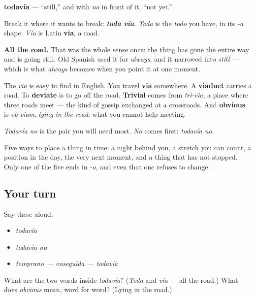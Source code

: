 \begin{cousinweb}
\textbf{todavía} — \textquotedblleft{}still,\textquotedblright{} and with \emph{no} in front of it, \textquotedblleft{}not yet.\textquotedblright{}

Break it where it wants to break: \emph{\textbf{toda vía}}. \emph{Toda} is the \emph{todo} you have, in its \emph{-a} shape. \emph{Vía} is Latin \textbf{via}, a road.

\textbf{All the road.} That was the whole sense once: the thing has gone the entire way and is going still. Old Spanish used it for \emph{always}, and it narrowed into \emph{still} — which is what \emph{always} becomes when you point it at one moment.

The \emph{via} is easy to find in English. You travel \textbf{via} somewhere. A \textbf{viaduct} carries a road. To \textbf{deviate} is to go off the road. \textbf{Trivial} comes from \emph{tri-via}, a place where three roads meet — the kind of gossip exchanged at a crossroads. And \textbf{obvious} is \emph{ob viam}, \emph{lying in the road}: what you cannot help meeting.

\emph{Todavía no} is the pair you will need most. \emph{No} comes first: \emph{todavía no}.
\end{cousinweb}

\begin{grammarlens}[title={What you've built}]
Five ways to place a thing in time: a night behind you, a stretch you can count, a position in the day, the very next moment, and a thing that has not stopped. Only one of the five ends in \emph{-o}, and even that one refuses to change.
\end{grammarlens}

\subsection*{Your turn}
Say these aloud:

\begin{itemize}
\raggedright
  \item \emph{todavía}
  \item \emph{todavía no}
  \item \emph{temprano — enseguida — todavía}
\end{itemize}

\begin{tcolorbox}[breakable,colback=teal!4,colframe=teal!35!black,title={Before you move on}]
What are the two words inside \emph{todavía}? (\emph{Toda} and \emph{vía} — all the road.) What does \emph{obvious} mean, word for word? (Lying in the road.)
\end{tcolorbox}
